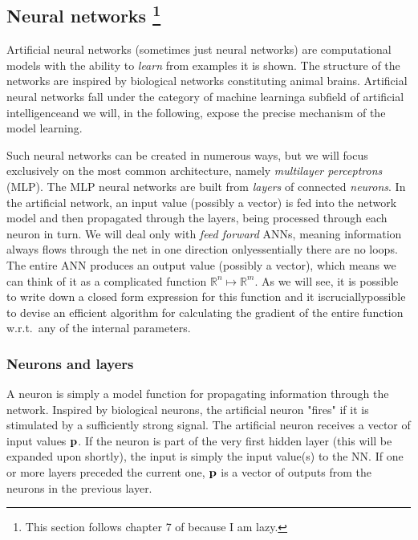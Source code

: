 \documentclass[a4paper, twocolumn]{article}
\begin{document}
\subsection[Neural networks]{Neural networks \protect\footnote{This section follows chapter 7 of \cite{ledum2017computational} because I am lazy.}}
Artificial neural networks (sometimes just neural networks) are computational models with the ability to \textit{learn} from examples it is shown. The structure of the networks are inspired by biological networks constituting animal brains. Artificial neural networks fall under the category of machine learning\textemdash a subfield of artificial intelligence\textemdash and we will, in the following, expose the precise mechanism of the model learning. 

Such neural networks can be created in numerous ways, but we will focus exclusively on the most common architecture, namely \emph{multilayer perceptrons} (MLP). The MLP neural networks are built from \emph{layers} of connected \emph{neurons}. In the artificial network, an input value (possibly a vector) is fed into the network model and then propagated through the layers, being processed through each neuron in turn. We will deal only with \emph{feed forward} ANNs, meaning information always flows through the net in one direction only\textemdash essentially there are no loops. The entire ANN produces an output value (possibly a vector), which means we can think of it as a complicated function $\mathbb{R}^n\mapsto \mathbb{R}^m$. As we will see, it is possible to write down a closed form expression for this function and it is\textemdash crucially\textemdash possible to devise an efficient algorithm for calculating the gradient of the entire function w.r.t.\ any of the internal parameters.

\subsubsection{Neurons and layers}
A neuron is simply a model function for propagating information through the network. Inspired by biological neurons, the artificial neuron "fires" if it is stimulated by a sufficiently strong signal. The artificial neuron receives a vector of input values ${\bf p}$. If the neuron is part of the very first hidden layer (this will be expanded upon shortly), the input is simply the input value(s) to the NN. If one or more layers preceded the current one, ${\bf p}$ is a vector of outputs from the neurons in the previous layer.
\end{document}
